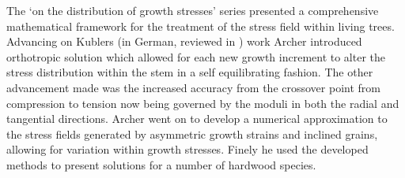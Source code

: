 The `on the distribution of growth stresses' series presented a comprehensive
mathematical framework for the treatment of the stress field within living
trees. Advancing on Kublers \cite{kubler1959a}\cite{kubler1959b} (in German, reviewed in \cite{Archer_1974}) work Archer introduced orthotropic solution which
allowed for each new growth increment to alter the stress distribution within
the stem in a self equilibrating fashion. The other advancement made was the
increased accuracy from the crossover point from compression to tension now being
governed by the moduli in both the radial and tangential directions.
Archer went on to develop a numerical approximation to the stress fields
generated by asymmetric growth strains and inclined grains, allowing for
variation within growth stresses. Finely he used the developed methods to
present solutions for a number of hardwood species.